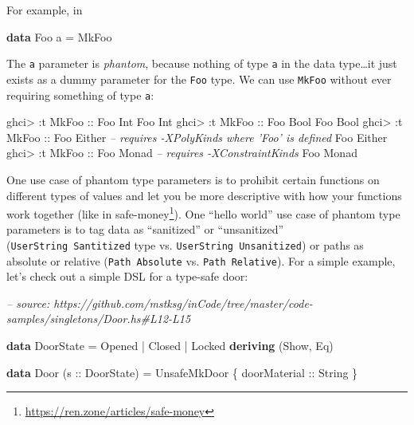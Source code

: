 \documentclass[]{article}
\newenvironment{Shaded}{}{}
\newcommand{\CommentTok}[1]{\textcolor[rgb]{0.38,0.63,0.69}{\textit{#1}}}
\newcommand{\DataTypeTok}[1]{\textcolor[rgb]{0.56,0.13,0.00}{#1}}
\newcommand{\FunctionTok}[1]{\textcolor[rgb]{0.02,0.16,0.49}{#1}}
\newcommand{\KeywordTok}[1]{\textcolor[rgb]{0.00,0.44,0.13}{\textbf{#1}}}
\newcommand{\NormalTok}[1]{#1}
\newcommand{\OtherTok}[1]{\textcolor[rgb]{0.00,0.44,0.13}{#1}}
\renewcommand{\href}[2]{#2\footnote{\url{#1}}}
\begin{document}
For example, in

\begin{Shaded}
\begin{Highlighting}[]
\KeywordTok{data} \DataTypeTok{Foo}\NormalTok{ a }\FunctionTok{=} \DataTypeTok{MkFoo}
\end{Highlighting}
\end{Shaded}

The \texttt{a} parameter is \emph{phantom}, because nothing of type \texttt{a}
in the data type\ldots{}it just exists as a dummy parameter for the \texttt{Foo}
type. We can use \texttt{MkFoo} without ever requiring something of type
\texttt{a}:

\begin{Shaded}
\begin{Highlighting}[]
\NormalTok{ghci}\FunctionTok{>} \FunctionTok{:}\NormalTok{t }\DataTypeTok{MkFoo}\OtherTok{ ::} \DataTypeTok{Foo} \DataTypeTok{Int}
\DataTypeTok{Foo} \DataTypeTok{Int}
\NormalTok{ghci}\FunctionTok{>} \FunctionTok{:}\NormalTok{t }\DataTypeTok{MkFoo}\OtherTok{ ::} \DataTypeTok{Foo} \DataTypeTok{Bool}
\DataTypeTok{Foo} \DataTypeTok{Bool}
\NormalTok{ghci}\FunctionTok{>} \FunctionTok{:}\NormalTok{t }\DataTypeTok{MkFoo}\OtherTok{ ::} \DataTypeTok{Foo} \DataTypeTok{Either}      \CommentTok{-- requires -XPolyKinds where 'Foo' is defined}
\DataTypeTok{Foo} \DataTypeTok{Either}
\NormalTok{ghci}\FunctionTok{>} \FunctionTok{:}\NormalTok{t }\DataTypeTok{MkFoo}\OtherTok{ ::} \DataTypeTok{Foo} \DataTypeTok{Monad}       \CommentTok{-- requires -XConstraintKinds}
\DataTypeTok{Foo} \DataTypeTok{Monad}
\end{Highlighting}
\end{Shaded}

One use case of phantom type parameters is to prohibit certain functions on
different types of values and let you be more descriptive with how your
functions work together (like in
\href{https://ren.zone/articles/safe-money}{safe-money}). One ``hello world''
use case of phantom type parameters is to tag data as ``sanitized'' or
``unsanitized'' (\texttt{UserString\ \textquotesingle{}Santitized} type vs.
\texttt{UserString\ \textquotesingle{}Unsanitized}) or paths as absolute or
relative (\texttt{Path\ \textquotesingle{}Absolute} vs.
\texttt{Path\ \textquotesingle{}Relative}). For a simple example, let's check
out a simple DSL for a type-safe door:

\begin{Shaded}
\begin{Highlighting}[]
\CommentTok{-- source: https://github.com/mstksg/inCode/tree/master/code-samples/singletons/Door.hs#L12-L15}

\KeywordTok{data} \DataTypeTok{DoorState} \FunctionTok{=} \DataTypeTok{Opened} \FunctionTok{|} \DataTypeTok{Closed} \FunctionTok{|} \DataTypeTok{Locked}
  \KeywordTok{deriving}\NormalTok{ (}\DataTypeTok{Show}\NormalTok{, }\DataTypeTok{Eq}\NormalTok{)}

\KeywordTok{data} \DataTypeTok{Door}\NormalTok{ (}\OtherTok{s ::} \DataTypeTok{DoorState}\NormalTok{) }\FunctionTok{=} \DataTypeTok{UnsafeMkDoor}\NormalTok{ \{}\OtherTok{ doorMaterial ::} \DataTypeTok{String}\NormalTok{ \}}
\end{Highlighting}
\end{Shaded}
\end{document}
